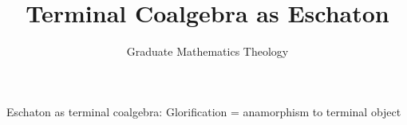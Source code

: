 \documentclass{article}
\begin{document}
\title{Terminal Coalgebra as Eschaton}
\author{Graduate Mathematics Theology}
\maketitle

\begin{theorem}

Eschaton as terminal coalgebra:
Glorification = anamorphism to terminal object
            
\end{theorem}
\end{document}
